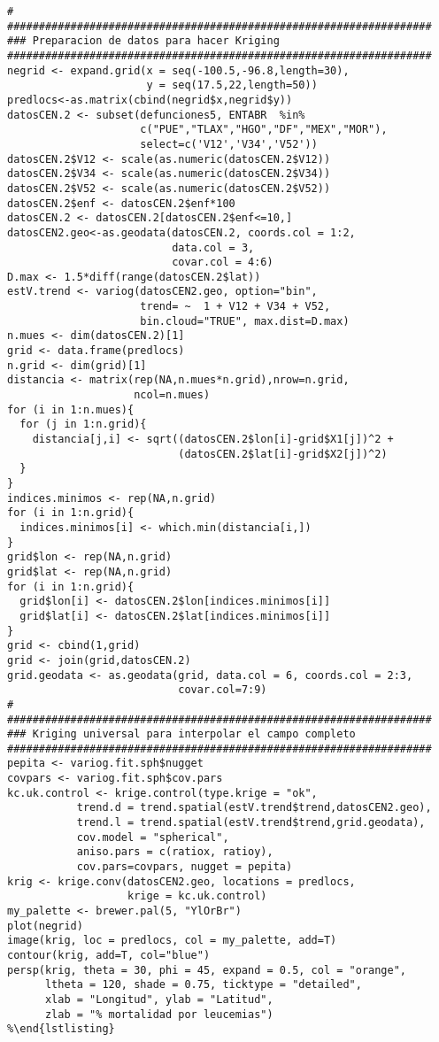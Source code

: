 \documentclass[11pt, oneside]{book}
\begin{document}
\begin{verbatim}
#
###################################################################
### Preparacion de datos para hacer Kriging
###################################################################
negrid <- expand.grid(x = seq(-100.5,-96.8,length=30),
                      y = seq(17.5,22,length=50))
predlocs<-as.matrix(cbind(negrid$x,negrid$y))
datosCEN.2 <- subset(defunciones5, ENTABR  %in% 
                     c("PUE","TLAX","HGO","DF","MEX","MOR"), 
                     select=c('V12','V34','V52'))
datosCEN.2$V12 <- scale(as.numeric(datosCEN.2$V12))
datosCEN.2$V34 <- scale(as.numeric(datosCEN.2$V34))
datosCEN.2$V52 <- scale(as.numeric(datosCEN.2$V52))
datosCEN.2$enf <- datosCEN.2$enf*100
datosCEN.2 <- datosCEN.2[datosCEN.2$enf<=10,]
datosCEN2.geo<-as.geodata(datosCEN.2, coords.col = 1:2, 
                          data.col = 3,
                          covar.col = 4:6) 
D.max <- 1.5*diff(range(datosCEN.2$lat))
estV.trend <- variog(datosCEN2.geo, option="bin",
                     trend= ~  1 + V12 + V34 + V52,
                     bin.cloud="TRUE", max.dist=D.max)
n.mues <- dim(datosCEN.2)[1]
grid <- data.frame(predlocs)
n.grid <- dim(grid)[1]
distancia <- matrix(rep(NA,n.mues*n.grid),nrow=n.grid,
                    ncol=n.mues)
for (i in 1:n.mues){
  for (j in 1:n.grid){
    distancia[j,i] <- sqrt((datosCEN.2$lon[i]-grid$X1[j])^2 + 
                           (datosCEN.2$lat[i]-grid$X2[j])^2)
  }
}
indices.minimos <- rep(NA,n.grid)
for (i in 1:n.grid){
  indices.minimos[i] <- which.min(distancia[i,]) 
}
grid$lon <- rep(NA,n.grid)
grid$lat <- rep(NA,n.grid)
for (i in 1:n.grid){
  grid$lon[i] <- datosCEN.2$lon[indices.minimos[i]]
  grid$lat[i] <- datosCEN.2$lat[indices.minimos[i]]
}
grid <- cbind(1,grid)
grid <- join(grid,datosCEN.2)
grid.geodata <- as.geodata(grid, data.col = 6, coords.col = 2:3, 
                           covar.col=7:9)
#
###################################################################
### Kriging universal para interpolar el campo completo
###################################################################
pepita <- variog.fit.sph$nugget
covpars <- variog.fit.sph$cov.pars
kc.uk.control <- krige.control(type.krige = "ok", 
           trend.d = trend.spatial(estV.trend$trend,datosCEN2.geo), 
           trend.l = trend.spatial(estV.trend$trend,grid.geodata), 
           cov.model = "spherical",
           aniso.pars = c(ratiox, ratioy),
           cov.pars=covpars, nugget = pepita)
krig <- krige.conv(datosCEN2.geo, locations = predlocs,
                   krige = kc.uk.control)
my_palette <- brewer.pal(5, "YlOrBr")
plot(negrid)
image(krig, loc = predlocs, col = my_palette, add=T)
contour(krig, add=T, col="blue")
persp(krig, theta = 30, phi = 45, expand = 0.5, col = "orange",
      ltheta = 120, shade = 0.75, ticktype = "detailed",
      xlab = "Longitud", ylab = "Latitud", 
      zlab = "% mortalidad por leucemias")  
%\end{lstlisting}
\end{verbatim}
\endgroup
\end{document}
